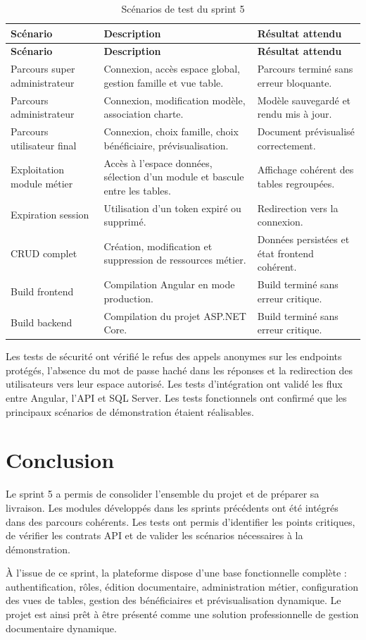 \begin{longtable}{p{} p{} p{}}
\caption{Scénarios de test du sprint 5}\\
\toprule
\textbf{Scénario} & \textbf{Description} & \textbf{Résultat attendu}\\
\midrule
\endfirsthead
\toprule
\textbf{Scénario} & \textbf{Description} & \textbf{Résultat attendu}\\
\midrule
\endhead
Parcours super administrateur & Connexion, accès espace global, gestion famille et vue table. & Parcours terminé sans erreur bloquante.\\
\midrule
Parcours administrateur & Connexion, modification modèle, association charte. & Modèle sauvegardé et rendu mis à jour.\\
\midrule
Parcours utilisateur final & Connexion, choix famille, choix bénéficiaire, prévisualisation. & Document prévisualisé correctement.\\
\midrule
Exploitation module métier & Accès à l'espace données, sélection d'un module et bascule entre les tables. & Affichage cohérent des tables regroupées.\\
\midrule
Expiration session & Utilisation d'un token expiré ou supprimé. & Redirection vers la connexion.\\
\midrule
CRUD complet & Création, modification et suppression de ressources métier. & Données persistées et état frontend cohérent.\\
\midrule
Build frontend & Compilation Angular en mode production. & Build terminé sans erreur critique.\\
\midrule
Build backend & Compilation du projet ASP.NET Core. & Build terminé sans erreur critique.\\
\bottomrule
\end{longtable}

Les tests de sécurité ont vérifié le refus des appels anonymes sur les endpoints protégés, l'absence du mot de passe haché dans les réponses et la redirection des utilisateurs vers leur espace autorisé. Les tests d'intégration ont validé les flux entre Angular, l'API et SQL Server. Les tests fonctionnels ont confirmé que les principaux scénarios de démonstration étaient réalisables.

\section{Conclusion}

Le sprint 5 a permis de consolider l'ensemble du projet et de préparer sa livraison. Les modules développés dans les sprints précédents ont été intégrés dans des parcours cohérents. Les tests ont permis d'identifier les points critiques, de vérifier les contrats API et de valider les scénarios nécessaires à la démonstration.

À l'issue de ce sprint, la plateforme dispose d'une base fonctionnelle complète : authentification, rôles, édition documentaire, administration métier, configuration des vues de tables, gestion des bénéficiaires et prévisualisation dynamique. Le projet est ainsi prêt à être présenté comme une solution professionnelle de gestion documentaire dynamique.
